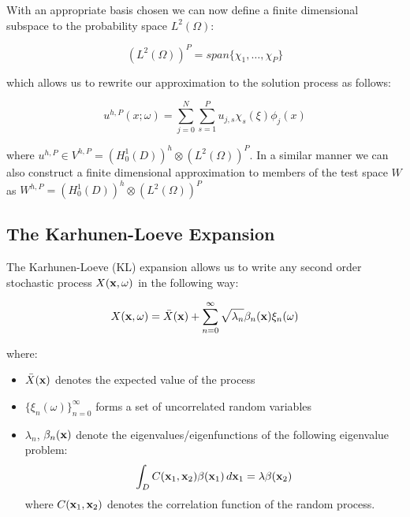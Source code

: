 With an appropriate basis chosen we can now define a finite dimensional
subspace to the probability space $L^2(\Omega)$:

\begin{equation}
    \left(L^2(\Omega)\right)^P = span\{\chi_1, \ldots, \chi_P\}
\end{equation}

which allows us to rewrite our approximation to the solution process
 as follows:

\begin{equation}\label{eq:oned-stochastic-uhp}
    u^{h,P}(x;\omega) = \sum_{j=0}^N\sum_{s=1}^Pu_{j,s}\chi_s(\xi)\phi_j(x)
\end{equation}

where $u^{h,P} \in V^{h,P} = \left(H^1_0(D)\right)^h \otimes
\left(L^2(\Omega)\right)^P$. In a similar manner we can also construct a finite
dimensional approximation to members of the test space $W$ as
$W^{h,P} = \left(H^1_0(D)\right)^h \otimes \left(L^2(\Omega)\right)^P$

\subsection{The Karhunen-Loeve Expansion}\label{sec:oned-stochastic-kl-expansion}

The Karhunen-Loeve (KL) expansion allows us to write any second order
stochastic process $X(\mathbf{x},\omega)$ in the following way:

\begin{equation}
    X(\mathbf{x}, \omega) = \bar{X}(\mathbf{x})
    + \sum_{n = 0}^\infty\sqrt{\lambda_n}\beta_n(\mathbf{x})\xi_n(\omega)
\end{equation}

where:

\begin{itemize}
    \item $\bar{X}(\mathbf{x})$ denotes the expected value of the process
    \item $\{\xi_n(\omega)\}_{n=0}^\infty$ forms a set of uncorrelated random
          variables
    \item $\lambda_n$, $\beta_n(\mathbf{x})$ denote the eigenvalues/eigenfunctions
          of the following eigenvalue problem:
          \[
                \int_DC(\mathbf{x}_1, \mathbf{x}_2)\beta(\mathbf{x}_1)\, d\mathbf{x}_1
                = \lambda\beta(\mathbf{x}_2)
          \]
          where $C(\mathbf{x}_1,\mathbf{x}_2)$ denotes the correlation function of the
          random process.
\end{itemize}

